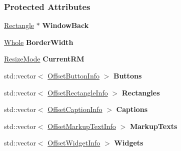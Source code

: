 \subsubsection*{Protected Attributes}
\begin{DoxyCompactItemize}
\item 
\hypertarget{classphys_1_1UI_1_1Window_a91635b1e1a94e74e76ebfe61611d1daf}{
\hyperlink{classphys_1_1UI_1_1Rectangle}{Rectangle} $\ast$ {\bfseries WindowBack}}
\label{classphys_1_1UI_1_1Window_a91635b1e1a94e74e76ebfe61611d1daf}

\item 
\hypertarget{classphys_1_1UI_1_1Window_af686c8e14e1a19b68cfb3332cc94c7b7}{
\hyperlink{namespacephys_a460f6bc24c8dd347b05e0366ae34f34a}{Whole} {\bfseries BorderWidth}}
\label{classphys_1_1UI_1_1Window_af686c8e14e1a19b68cfb3332cc94c7b7}

\item 
\hypertarget{classphys_1_1UI_1_1Window_acde8d004d5ac67b969fbd66b35f818fa}{
\hyperlink{classphys_1_1UI_1_1Window_ab7ecb300d312f54556615d3a3b8c6dc9}{ResizeMode} {\bfseries CurrentRM}}
\label{classphys_1_1UI_1_1Window_acde8d004d5ac67b969fbd66b35f818fa}

\item 
\hypertarget{classphys_1_1UI_1_1Window_a5fccbc2f8975e9a60b4b7c6d5eca4844}{
std::vector$<$ \hyperlink{structphys_1_1UI_1_1ResizingInfo}{OffsetButtonInfo} $>$ {\bfseries Buttons}}
\label{classphys_1_1UI_1_1Window_a5fccbc2f8975e9a60b4b7c6d5eca4844}

\item 
\hypertarget{classphys_1_1UI_1_1Window_a556a43730021df62a867af76a03069b0}{
std::vector$<$ \hyperlink{structphys_1_1UI_1_1ResizingInfo}{OffsetRectangleInfo} $>$ {\bfseries Rectangles}}
\label{classphys_1_1UI_1_1Window_a556a43730021df62a867af76a03069b0}

\item 
\hypertarget{classphys_1_1UI_1_1Window_acaa4a2954c71b6a9ea6edb1941ca053d}{
std::vector$<$ \hyperlink{structphys_1_1UI_1_1ResizingInfo}{OffsetCaptionInfo} $>$ {\bfseries Captions}}
\label{classphys_1_1UI_1_1Window_acaa4a2954c71b6a9ea6edb1941ca053d}

\item 
\hypertarget{classphys_1_1UI_1_1Window_ac50afa68d42e2f30ea5d470b03be4786}{
std::vector$<$ \hyperlink{structphys_1_1UI_1_1ResizingInfo}{OffsetMarkupTextInfo} $>$ {\bfseries MarkupTexts}}
\label{classphys_1_1UI_1_1Window_ac50afa68d42e2f30ea5d470b03be4786}

\item 
\hypertarget{classphys_1_1UI_1_1Window_a2fc4fb5f39925eff948c8cb61f9a724f}{
std::vector$<$ \hyperlink{structphys_1_1UI_1_1ResizingInfo}{OffsetWidgetInfo} $>$ {\bfseries Widgets}}
\label{classphys_1_1UI_1_1Window_a2fc4fb5f39925eff948c8cb61f9a724f}

\end{DoxyCompactItemize}


